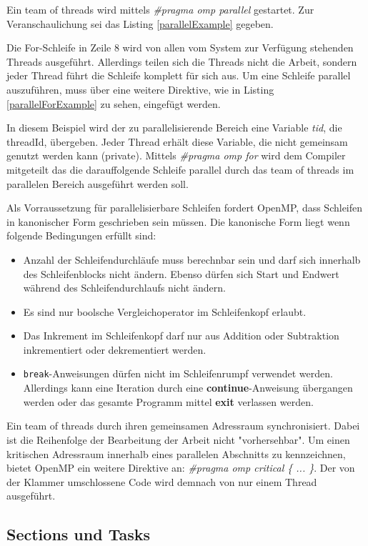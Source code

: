 \documentclass[11pt]{scrartcl}
\begin{document}
Ein team of threads wird mittels \textit{\#pragma omp parallel} gestartet. Zur Veranschaulichung sei das Listing \ref{parallelExample} gegeben. 

Die For-Schleife in Zeile 8 wird von allen vom System zur Verfügung stehenden Threads ausgeführt. Allerdings teilen sich die Threads nicht die Arbeit, sondern jeder Thread führt die Schleife komplett für sich aus. Um eine Schleife parallel auszuführen, muss über eine weitere Direktive, wie in Listing \ref{parallelForExample} zu sehen, eingefügt werden. 

In diesem Beispiel wird der zu parallelisierende Bereich eine Variable \textit{tid}, die threadId, übergeben. Jeder Thread erhält diese Variable, die nicht gemeinsam genutzt werden kann (private). Mittels \textit{\#pragma omp for} wird dem Compiler mitgeteilt das die darauffolgende Schleife parallel durch das team of threads  im parallelen Bereich ausgeführt werden soll.

Als Vorraussetzung für parallelisierbare Schleifen fordert OpenMP, dass Schleifen in kanonischer Form geschrieben sein müssen. Die kanonische Form liegt wenn folgende Bedingungen erfüllt sind: 
\begin{itemize}
\item Anzahl der Schleifendurchläufe muss berechnbar sein und darf sich innerhalb des Schleifenblocks nicht ändern. Ebenso dürfen sich Start und Endwert während des Schleifendurchlaufs nicht ändern.
\item Es sind nur boolsche Vergleichoperator im Schleifenkopf erlaubt.
\item Das Inkrement im Schleifenkopf darf nur aus Addition oder Subtraktion inkrementiert oder dekrementiert werden. 
\item \texttt{break}-Anweisungen dürfen nicht im Schleifenrumpf verwendet werden. Allerdings kann eine Iteration durch eine \textbf{continue}-Anweisung übergangen werden oder das gesamte Programm mittel \textbf{exit} verlassen werden.
\end{itemize}

Ein team of threads durch ihren gemeinsamen Adressraum synchronisiert. Dabei ist die Reihenfolge der Bearbeitung der Arbeit nicht "vorhersehbar". Um einen kritischen Adressraum innerhalb eines parallelen Abschnitts zu kennzeichnen, bietet OpenMP ein weitere Direktive an: \textit{\#pragma omp critical \{ ... \}}. Der von der Klammer umschlossene Code wird demnach von nur einem Thread ausgeführt. 

\subsection{Sections und Tasks}
\end{document}
